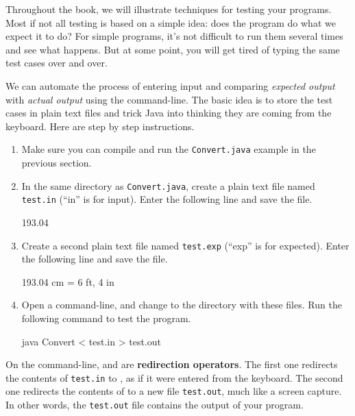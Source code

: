 Throughout the book, we will illustrate techniques for testing your programs.
Most if not all testing is based on a simple idea: does the program do what we expect it to do?
For simple programs, it's not difficult to run them several times and see what happens.
But at some point, you will get tired of typing the same test cases over and over.

We can automate the process of entering input and comparing {\em expected output} with {\em actual output} using the command-line.
The basic idea is to store the test cases in plain text files and trick Java into thinking they are coming from the keyboard.
Here are step by step instructions.

\begin{enumerate}

\item Make sure you can compile and run the {\tt Convert.java} example in the previous section.

\item In the same directory as {\tt Convert.java}, create a plain text file named {\tt test.in} (``in'' is for input).
Enter the following line and save the file.

\begin{stdout}
193.04
\end{stdout}

\item Create a second plain text file named {\tt test.exp} (``exp'' is for expected).
Enter the following line and save the file.

\begin{stdout}
193.04 cm = 6 ft, 4 in
\end{stdout}

\item Open a command-line, and change to the directory with these files.
Run the following command to test the program.

\begin{stdout}
java Convert < test.in > test.out
\end{stdout}

\end{enumerate}

On the command-line, \java{<} and \java{>} are {\bf redirection operators}.
The first one redirects the contents of {\tt test.in} to , as if it were entered from the keyboard.
The second one redirects the contents of  to a new file {\tt test.out}, much like a screen capture.
In other words, the {\tt test.out} file contains the output of your program.

